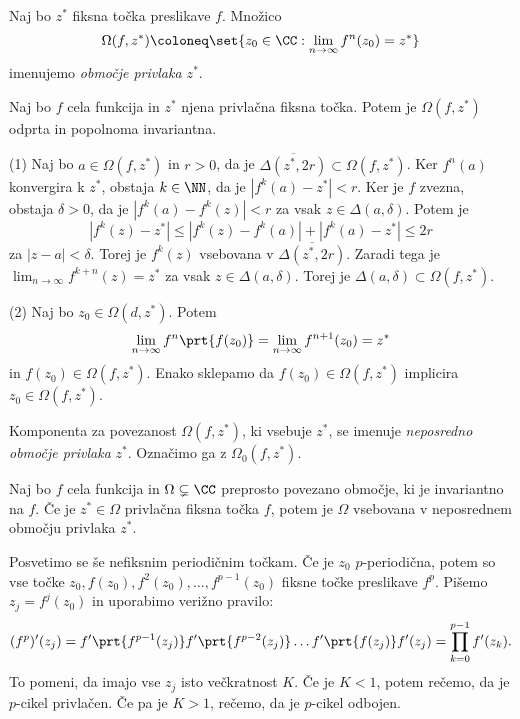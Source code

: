 \begin{definicija}
    Naj bo \(z^*\) fiksna točka preslikave \(f\). Množico
    \[\Omega (f, z^*) \coloneq \set{z_0 \in \CC : \lim_{n \to \infty} f^n (z_0) = z^*}\]
    imenujemo \emph{območje privlaka \(z^*\)}.
\end{definicija}

\begin{izrek}
    Naj bo \(f\) cela funkcija in \(z^*\) njena privlačna fiksna točka. Potem je \(\Omega (f, z^*)\) odprta in popolnoma invariantna.
\end{izrek}

\begin{dokaz}
    (1) Naj bo \(a \in \Omega (f, z^*)\) in \(r > 0\), da je \(\overline{\Delta (z^*, 2r)} \subset \Omega (f, z^*)\). Ker \(f^n (a)\) konvergira k \(z^*\), obstaja \(k \in \NN\), da je \(|f^k (a) - z^*| < r\). Ker je \(f\) zvezna, obstaja \(\delta > 0\), da je \(|f^k (a) - f^k (z)| < r\) za vsak \(z \in \Delta (a, \delta)\). Potem je
    \[|f^k (z) - z^*| \leq |f^k (z) - f^k (a)| + |f^k (a) - z^*| \leq 2r\]
    za \(|z - a| < \delta\). Torej je \(f^k (z)\) vsebovana v \(\overline{\Delta (z^*, 2r)}\). Zaradi tega je \(\lim_{n \to \infty} f^{k + n} (z) = z^*\) za vsak \(z \in \Delta (a, \delta)\). Torej je \(\Delta (a, \delta) \subset \Omega (f, z^*)\).

    (2) Naj bo \(z_0 \in \Omega (d, z^*)\). Potem
    \[\lim_{n \to \infty} f^n \prt{f (z_0)} = \lim_{n \to \infty} f^{n + 1} (z_0) = z^*\]
    in \(f (z_0) \in \Omega(f, z^*)\). Enako sklepamo da \(f (z_0) \in \Omega (f, z^*)\) implicira \(z_0 \in \Omega (f, z^*)\).
\end{dokaz}

\noindent Komponenta za povezanost \(\Omega (f, z^*)\), ki vsebuje \(z^*\), se imenuje \emph{neposredno območje privlaka} \(z^*\). Označimo ga z \(\Omega_0 (f, z^*)\).

\begin{trditev} \label{prop:privlak}
    Naj bo \(f\) cela funkcija in \(\Omega \subsetneq \CC\) preprosto povezano območje, ki je invariantno na \(f\). Če je \(z^{*} \in \Omega\) privlačna fiksna točka \(f\), potem je \(\Omega\) vsebovana v neposrednem območju privlaka \(z^*\).
\end{trditev}

Posvetimo se še nefiksnim periodičnim točkam. Če je \(z_0\) \(p\)-periodična, potem so vse točke \(z_0, f (z_0), f^2 (z_0), \dots, f^{p - 1} (z_0)\) fiksne točke preslikave \(f^p\). Pišemo \(z_j = f^j (z_0)\) in uporabimo verižno pravilo:
\[(f^p)' (z_j) = f' \prt{f^{p - 1} (z_j)} f' \prt{f^{p - 2} (z_j)} \dots f' \prt{f (z_j)} f' (z_j) = \prod_{k = 0}^{p - 1} f' (z_k).\]
To pomeni, da imajo vse \(z_j\) isto večkratnost \(K\). Če je \(K < 1\), potem rečemo, da je \(p\)-cikel privlačen. Če pa je \(K > 1\), rečemo, da je \(p\)-cikel odbojen.

